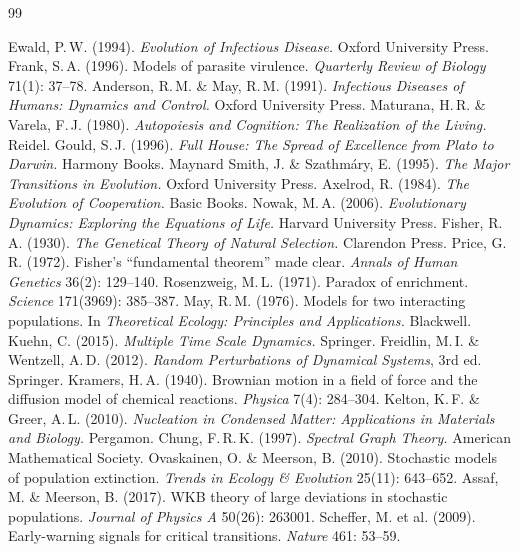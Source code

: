 \documentclass[11pt]{article}
\theoremstyle{plain}
\theoremstyle{definition}
\begin{document}
\begin{thebibliography}{99}

 Ewald, P.\,W. (1994). \emph{Evolution of Infectious Disease.} Oxford University Press.
 Frank, S.\,A. (1996). Models of parasite virulence. \emph{Quarterly Review of Biology} 71(1): 37--78.
 Anderson, R.\,M. \& May, R.\,M. (1991). \emph{Infectious Diseases of Humans: Dynamics and Control.} Oxford University Press.
 Maturana, H.\,R. \& Varela, F.\,J. (1980). \emph{Autopoiesis and Cognition: The Realization of the Living.} Reidel.
 Gould, S.\,J. (1996). \emph{Full House: The Spread of Excellence from Plato to Darwin.} Harmony Books.
 Maynard Smith, J. \& Szathm\'ary, E. (1995). \emph{The Major Transitions in Evolution.} Oxford University Press.
 Axelrod, R. (1984). \emph{The Evolution of Cooperation.} Basic Books.
 Nowak, M.\,A. (2006). \emph{Evolutionary Dynamics: Exploring the Equations of Life.} Harvard University Press.
 Fisher, R.\,A. (1930). \emph{The Genetical Theory of Natural Selection.} Clarendon Press.
 Price, G.\,R. (1972). Fisher's ``fundamental theorem'' made clear. \emph{Annals of Human Genetics} 36(2): 129--140.
 Rosenzweig, M.\,L. (1971). Paradox of enrichment. \emph{Science} 171(3969): 385--387.
 May, R.\,M. (1976). Models for two interacting populations. In \emph{Theoretical Ecology: Principles and Applications.} Blackwell.
 Kuehn, C. (2015). \emph{Multiple Time Scale Dynamics.} Springer.
 Freidlin, M.\,I. \& Wentzell, A.\,D. (2012). \emph{Random Perturbations of Dynamical Systems}, 3rd ed. Springer.
 Kramers, H.\,A. (1940). Brownian motion in a field of force and the diffusion model of chemical reactions. \emph{Physica} 7(4): 284--304.
 Kelton, K.\,F. \& Greer, A.\,L. (2010). \emph{Nucleation in Condensed Matter: Applications in Materials and Biology.} Pergamon.
 Chung, F.\,R.\,K. (1997). \emph{Spectral Graph Theory.} American Mathematical Society.
 Ovaskainen, O. \& Meerson, B. (2010). Stochastic models of population extinction. \emph{Trends in Ecology \& Evolution} 25(11): 643--652.
 Assaf, M. \& Meerson, B. (2017). WKB theory of large deviations in stochastic populations. \emph{Journal of Physics A} 50(26): 263001.
 Scheffer, M. et al. (2009). Early-warning signals for critical transitions. \emph{Nature} 461: 53--59.

\end{thebibliography}
\end{document}
